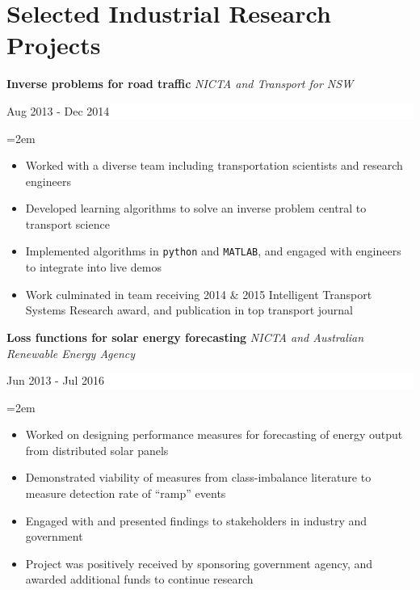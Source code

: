 \documentclass[fontsize=11pt]{article}
\newcommand{\NewPart}[1]{\section*{#1}}
\newcommand{\EducationEntry}[4]{
    \noindent \textbf{#1}
    \textit{#3}
    \hfill      %
    \colorbox{White}{
      \parbox{9em}{
      \hfill\color{Black}#2}} \par  %
    \noindent\hangindent=2em\hangafter=0 \small #4 %
    \normalsize \par}
\newcommand{\WorkEntry}[4]{       %
    \noindent
    \textbf{#1}
    \textit{#3} %
    \hfill      %
    \colorbox{White}{%
      \parbox{9em}{%
      \hfill\color{Black}#2}} \par   %
    \noindent\hangindent=2em\hangafter=0 \small #4 %
    \normalsize \par}
\newcommand{\ProjectEntry}[4]{         %
    \noindent \textbf{#1} \noindent {#2} {#3} \par
    \noindent \small #4 %
    \normalsize \par}
\begin{document}




\NewPart{Selected Industrial Research Projects}{}

\WorkEntry
{Inverse problems for road traffic}
{Aug 2013 - Dec 2014}
{NICTA and Transport for NSW}
{
\begin{itemize} 
    \itemsep-0.1\baselineskip
    \item Worked with a diverse team including transportation scientists and research engineers             
    \item Developed learning algorithms to solve an inverse problem central to transport science
    \item Implemented algorithms in {\tt python} and {\tt MATLAB}, and engaged with engineers to integrate into live demos
    \item Work culminated in team receiving 2014 \& 2015 Intelligent Transport Systems Research award, and publication in top transport journal
\end{itemize}
}

\WorkEntry
{Loss functions for solar energy forecasting}
{Jun 2013 - Jul 2016}
{NICTA and Australian Renewable Energy Agency}
{
\begin{itemize}
    \itemsep-0.1\baselineskip
    \item Worked on designing performance measures for forecasting of energy output from distributed solar panels
    \item Demonstrated viability of measures from class-imbalance literature to measure detection rate of ``ramp'' events
    \item Engaged with and presented findings to stakeholders in industry and government
    \item Project was positively received by sponsoring government agency, and awarded additional funds to continue research
\end{itemize}
}
\end{document}

